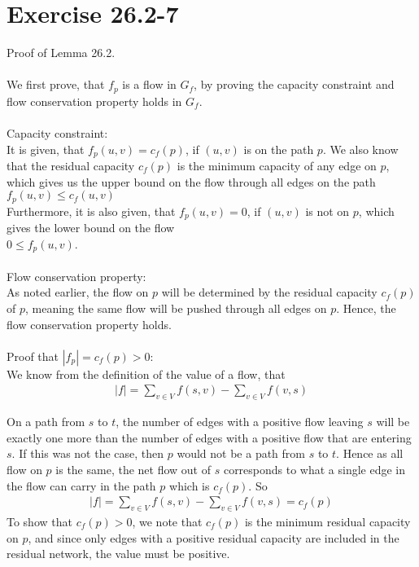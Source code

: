 \section*{Exercise 26.2-7}
Proof of Lemma 26.2.
\\
\\
We first prove, that $f_p$ is a flow in $G_f$, by proving the capacity constraint and flow conservation property holds in $G_f$.
\\
\\
Capacity constraint:
\\
It is given, that $f_p(u,v)=c_f(p)$, if $(u,v)$ is on the path $p$. We also know that the residual capacity $c_f(p)$ is the minimum capacity of any edge on $p$, which gives us the upper bound on the flow through all edges on the path
\\
$f_p(u,v)\leq c_f(u,v)$
\\
Furthermore, it is also given, that $f_p(u,v)=0$, if $(u,v)$ is not on $p$, which gives the lower bound on the flow
\\
$0 \leq f_p(u,v)$.
\\
\\
Flow conservation property:
\\
As noted earlier, the flow on $p$ will be determined by the residual capacity $c_f(p)$ of $p$, meaning the same flow will be pushed through all edges on $p$. Hence, the flow conservation property holds.
\\
\\
Proof that $|f_p| = c_f(p)>0$:
\\
We know from the definition of the value of a flow, that 
\begin{align}
|f| = \sum_{v\in V}f(s,v) - \sum_{v\in V}f(v,s)
\end{align}

On a path from $s$ to $t$, the number of edges with a positive flow leaving $s$ will be exactly one more than the number of edges with a positive flow that are entering $s$. If this was not the case, then $p$ would not be a path from $s$ to $t$. Hence as all flow on $p$ is the same, the net flow out of $s$ corresponds to what a single edge in the flow can carry in the path $p$ which is $c_f(p)$. So
\begin{align}
|f| = \sum_{v\in V}f(s,v) - \sum_{v\in V}f(v,s) = c_f(p)
\end{align}
To show that $c_f(p)>0$, we note that $c_f(p)$ is the minimum residual capacity on $p$, and since only edges with a positive residual capacity are included in the residual network, the value must be positive.